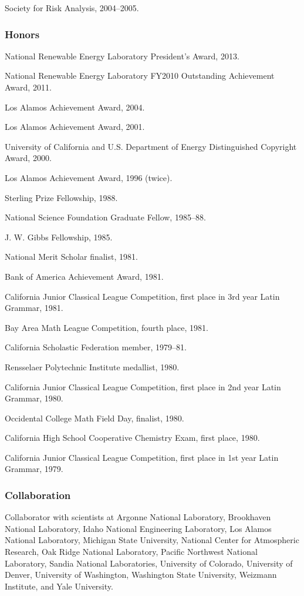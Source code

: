 \documentclass[]{article}
\begin{document}
Society for Risk Analysis, 2004--2005.

\subsubsection{Honors}\label{honors}

National Renewable Energy Laboratory President's Award, 2013.

National Renewable Energy Laboratory FY2010 Outstanding Achievement
Award, 2011.

Los Alamos Achievement Award, 2004.

Los Alamos Achievement Award, 2001.

University of California and U.S. Department of Energy Distinguished
Copyright Award, 2000.

Los Alamos Achievement Award, 1996 (twice).

Sterling Prize Fellowship, 1988.

National Science Foundation Graduate Fellow, 1985--88.

J. W. Gibbs Fellowship, 1985.

National Merit Scholar finalist, 1981.

Bank of America Achievement Award, 1981.

California Junior Classical League Competition, first place in 3rd year
Latin Grammar, 1981.

Bay Area Math League Competition, fourth place, 1981.

California Scholastic Federation member, 1979--81.

Rensselaer Polytechnic Institute medallist, 1980.

California Junior Classical League Competition, first place in 2nd year
Latin Grammar, 1980.

Occidental College Math Field Day, finalist, 1980.

California High School Cooperative Chemistry Exam, first place, 1980.

California Junior Classical League Competition, first place in 1st year
Latin Grammar, 1979.

\subsubsection{Collaboration}\label{collaboration}

Collaborator with scientists at Argonne National Laboratory, Brookhaven
National Laboratory, Idaho National Engineering Laboratory, Los Alamos
National Laboratory, Michigan State University, National Center for
Atmospheric Research, Oak Ridge National Laboratory, Pacific Northwest
National Laboratory, Sandia National Laboratories, University of
Colorado, University of Denver, University of Washington, Washington
State University, Weizmann Institute, and Yale University.
\end{document}
